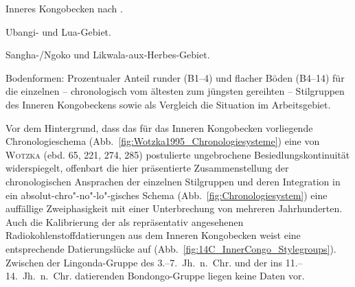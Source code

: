 \begin{table*}[!tb]
	\centering
	\begin{subtable}{\textwidth}
		\centering
		{\scriptsize 
			
		}
		\caption{Inneres Kongobecken nach \textcite[63 Tab.~7, 70 Tab.~13, 75 Tab.~17, 80 Tab.~21, 86, 91, 96 Tab.~31, 101 Tab.~36, 105, 109 Tab.~42, 117 Tab.~48, 123, 131 Tab.~57, 140, 145, 154 Tab. 69]{Wotzka.1995}.}
		\label{fig:Wotzka1995Bodenformen}
	\end{subtable}
	\par\vspace{.5cm}
	\begin{subtable}{\textwidth}
		\centering
		{\scriptsize 
			
		}
		\caption{Ubangi- und Lua-Gebiet.}
		\label{fig:nwCongoBodenformenUbangiLua}
	\end{subtable}
	\par\vspace{.5cm}
	\begin{subtable}{\textwidth}
		\centering
		{\scriptsize 
			
		}
		\caption{Sangha-/Ngoko und Likwala-aux-Herbes-Gebiet.}
		\label{fig:nwCongoBodenformenSanghaLikwala}
	\end{subtable}
	\caption{Bodenformen: Prozentualer Anteil runder (B1--4) und flacher Böden (B4--14) für die einzelnen -- chronologisch vom ältesten zum jüngsten gereihten -- Stilgruppen des Inneren Kongobeckens sowie als Vergleich die Situation im Arbeitsgebiet.}
	\label{fig:VglBodenformen}
\end{table*}

Vor dem Hintergrund, dass das für das Inneren Kongobecken vorliegende Chronologieschema (Abb.~\ref{fig:Wotzka1995_Chronologiesysteme}) eine von \textsc{Wotzka} (ebd. 65, 221, 274, 285) postulierte ungebrochene Besiedlungskontinuität widerspiegelt, offenbart die hier präsentierte Zusammenstellung der chronologischen Ansprachen der einzelnen Stilgruppen und deren Integration in ein absolut-chro"-no"-lo"-gisches Schema (Abb.~\ref{fig:Chronologiesystem}) eine auffällige Zweiphasigkeit mit einer Unterbrechung von mehreren Jahrhunderten. Auch die Kalibrierung der als repräsentativ angesehenen Radiokohlenstoffdatierungen aus dem Inneren Kongobecken weist eine entsprechende Datierungslücke auf (Abb.~\ref{fig:14C_InnerCongo_Stylegroups}). Zwischen der Lingonda-Gruppe des 3.--7.~Jh.~n.~Chr. und der ins 11.--14.~Jh.~n.~Chr. datierenden Bondongo-Gruppe liegen keine Daten vor. 

